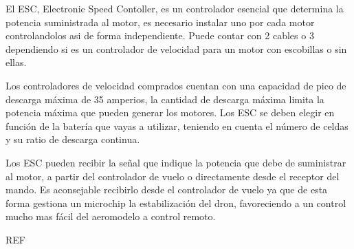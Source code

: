 
 El ESC, Electronic Speed Contoller, es un controlador esencial que determina la potencia suministrada al motor, es necesario instalar uno por cada motor controlandolos asi de forma independiente. 
 Puede contar con 2 cables o 3 dependiendo si es un controlador de velocidad para un motor con escobillas o sin ellas.
 
 Los controladores de velocidad comprados cuentan con una capacidad de pico de descarga máxima de 35 amperios, la cantidad de descarga máxima limita la potencia máxima que pueden generar los motores. Los ESC se deben elegir en función de la batería que vayas a utilizar, teniendo en cuenta el número de celdas y su ratio de descarga continua.
 
 Los ESC pueden recibir la señal que indique la potencia que debe de suministrar al motor, a partir del controlador de vuelo o directamente desde el receptor del mando. Es aconsejable recibirlo desde el controlador de vuelo ya que de esta forma gestiona un microchip la estabilización del dron, favoreciendo a un control mucho mas fácil del aeromodelo a control remoto.

REF %
 